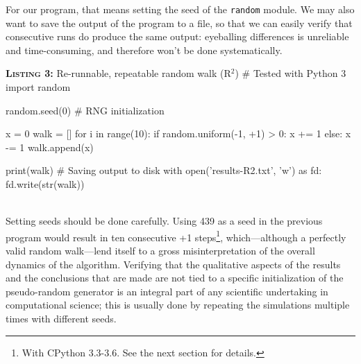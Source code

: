 \documentclass[a4paper,11pt]{article}
\begin{document}
For our program, that means setting the seed of the {\tt random} module. We may also want to save the output of the program to a file, so that we can easily verify that consecutive runs do produce the same output: eyeballing differences is unreliable and  time-consuming, and therefore won't be done systematically.\\

\noindent \begin{minipage}[c]{\linewidth}
\begin{code}{\textbf{\textsc{Listing 3:}} Re-runnable, repeatable random walk (R$^2$)}
# Tested with Python 3
import random

random.seed(0) # RNG initialization

x =  0
walk = []
for i in range(10):
    if random.uniform(-1, +1) > 0:
        x += 1
    else:
        x -= 1
    walk.append(x)

print(walk)
# Saving output to disk
with open('results-R2.txt', 'w') as fd:
    fd.write(str(walk))
\end{code}
\end{minipage}\\

Setting seeds should be done carefully. Using 439 as a seed in the previous program would result in ten consecutive +1 steps\footnote{With CPython 3.3-3.6. See the next section for details.}, which---although a perfectly valid random walk---lend itself to a gross misinterpretation of the overall dynamics of the algorithm. Verifying that the qualitative aspects of the results and the conclusions that are made are not tied to a specific initialization of the pseudo-random generator is an integral part of any scientific undertaking in computational science;
this is usually done by repeating the simulations multiple times with different seeds.

\end{document}
